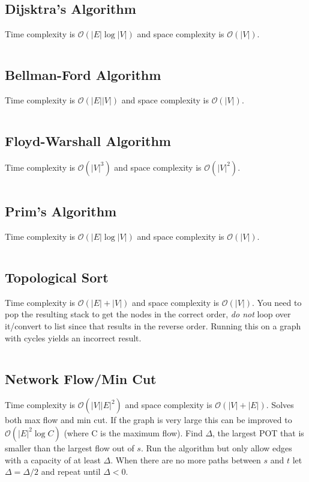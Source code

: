 \documentclass[8pt,a4paper,landscape,oneside]{amsart}
\newcommand{\code}[1]{\inputminted[fontsize=\normalsize,baselinestretch=1]{java}{code/#1}}
\newcommand{\bigO}{\mathcal{O}}
\begin{document}
\begin{multicols*}{3}
  \subsection{Dijsktra's Algorithm}
  Time complexity is $\bigO(|E| \log{|V|})$ and space complexity is $\bigO(|V|)$.
  \code{Graphs/Dijkstras.java}
  
  \subsection{Bellman-Ford Algorithm}
  Time complexity is $\bigO(|E||V|)$ and space complexity is $\bigO(|V|)$.
  \code{Graphs/BellmanFord.java}
  
  \subsection{Floyd-Warshall Algorithm}
  Time complexity is $\bigO(|V|^3)$ and space complexity is $\bigO(|V|^2)$.
  \code{Graphs/FloydWarshall.java}
  
  \subsection{Prim's Algorithm}
  Time complexity is $\bigO(|E| \log{|V|})$ and space complexity is $\bigO(|V|)$.
  \code{Graphs/MST.java}
  
  \subsection{Topological Sort}
  Time complexity is $\bigO(|E| + |V|)$ and space complexity is $\bigO(|V|)$. You need to pop the resulting stack to get the nodes in the correct order, \textit{do not} loop over it/convert to list since that results in the reverse order. Running this on a graph with cycles yields an incorrect result.
  \code{Graphs/TopologicalSort.java}
  
  \subsection{Network Flow/Min Cut}
  Time complexity is $\bigO(|V||E|^2)$ and space complexity is $\bigO(|V|+|E|)$. Solves both max flow and min cut. If the graph is very large this can be improved to $\bigO(|E|^2 \log{C})$ (where C is the maximum flow). Find $\Delta$, the largest POT that is smaller than the largest flow out of $s$. Run the algorithm but only allow edges with a capacity of at least $\Delta$. When there are no more paths between $s$ and $t$ let $\Delta = \Delta / 2$ and repeat until $\Delta < 0$.
  \code{Graphs/NetworkFlow.java}
  

\end{multicols*}
\end{document}
